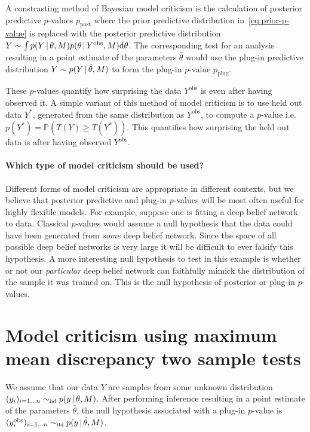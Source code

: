 \documentclass{article} %
\def\ie{i.e.\ }
\begin{document}
A constrasting method of Bayesian model criticism is the calculation of posterior predictive $p$-values \citep[e.g.][]{Guttman1967-my, Rubin1984-tw} $p_\textrm{post}$ where the prior predictive distribution in~\eqref{eq:prior-p-value} is replaced with the posterior predictive distribution ${Y \sim \int p(Y \,|\, \theta, M)p(\theta \,|\, Y^\textrm{obs}, M) \mathrm{d}\theta}$.
The corresponding test for an analysis resulting in a point estimate of the parameters $\hat\theta$ would use the plug-in predictive distribution ${Y \sim p(Y \,|\, \hat\theta, M)}$ to form the plug-in $p$-value $p_\textrm{plug}$.

These $p$-values quantify how surprising the data $Y^\textrm{obs}$ is even after having observed it.
A simple variant of this method of model criticism is to use held out data $Y^*$, generated from the same distribution as $Y^\textrm{obs}$, to compute a $p$-value \ie ${p(Y^*) = \mathbb{P}(T(Y)\geq T(Y^*))}$.
This quantifies how surprising the held out data is after having observed $Y^\textrm{obs}$.

\paragraph{Which type of model criticism should be used?}

Different forms of model criticism are appropriate in different contexts, but we believe that posterior predictive and plug-in $p$-values will be most often useful for highly flexible models.
For example, suppose one is fitting a deep belief network to data.
Classical $p$-values would assume a null hypothesis that the data could have been generated from \emph{some} deep belief network.
Since the space of all possible deep belief networks is very large it will be difficult to ever falsify this hypothesis.
A more interesting null hypothesis to test in this example is whether or not our \emph{particular} deep belief network can faithfully mimick the distribution of the sample it was trained on.
This is the null hypothesis of posterior or plug-in $p$-values.

\section{Model criticism using maximum mean discrepancy two sample tests}
\label{sec:model-crit-two-sample}

We assume that our data $Y$ are \iid samples from some unknown distribution ${(y_i)_{i=1\ldots n} \simiid p(y\given \theta, M)}$.
After performing inference resulting in a point estimate of the parameters $\hat\theta$, the null hypothesis associated with a plug-in $p$-value is ${(y^\textrm{obs}_i)_{i=1\ldots n} \simiid p(y \given \hat\theta, M)}$.
\end{document}

